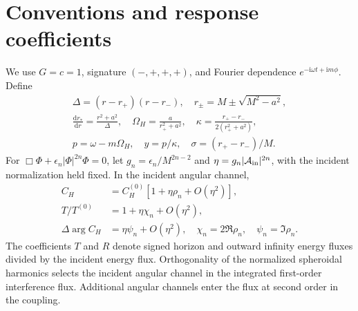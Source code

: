 \documentclass[aps,prd,twocolumn,10pt,nofootinbib,superscriptaddress,floatfix]{revtex4-2}
\newcommand{\ii}{\mathrm{i}}
\newcommand{\dd}{\mathrm{d}}
\begin{document}
\section{Conventions and response coefficients}
We use $G=c=1$, signature $(-,+,+,+)$, and Fourier dependence
$e^{-\ii\omega t+\ii m\phi}$. Define
\begin{gather}
\Delta=(r-r_+)(r-r_-),\quad r_\pm=M\pm\sqrt{M^2-a^2},\\
\frac{\dd r_*}{\dd r}=\frac{r^2+a^2}{\Delta},\quad
\Omega_H=\frac{a}{r_+^2+a^2},\quad
\kappa=\frac{r_+-r_-}{2(r_+^2+a^2)},\\
p=\omega-m\Omega_H,\quad y=p/\kappa,\quad
\sigma=(r_+-r_-)/M.
\end{gather}
For $\Box\Phi+\epsilon_n|\Phi|^{2n}\Phi=0$, let
$g_n=\epsilon_n/M^{2n-2}$ and
$\eta=g_n|\mathcal A_{\rm in}|^{2n}$, with the incident normalization
held fixed. In the incident angular channel,
\begin{align}
C_H&=C_H^{(0)}[1+\eta\rho_n+O(\eta^2)],\\
T/T^{(0)}&=1+\eta\chi_n+O(\eta^2),\\
\Delta\arg C_H&=\eta\psi_n+O(\eta^2),\quad
\chi_n=2\Re\rho_n,\quad\psi_n=\Im\rho_n.
\end{align}
The coefficients $T$ and $R$ denote signed horizon and outward infinity
energy fluxes divided by the incident energy flux. Orthogonality of the
normalized spheroidal harmonics selects the incident angular channel in
the integrated first-order interference flux. Additional angular channels
enter the flux at second order in the coupling.
\end{document}
